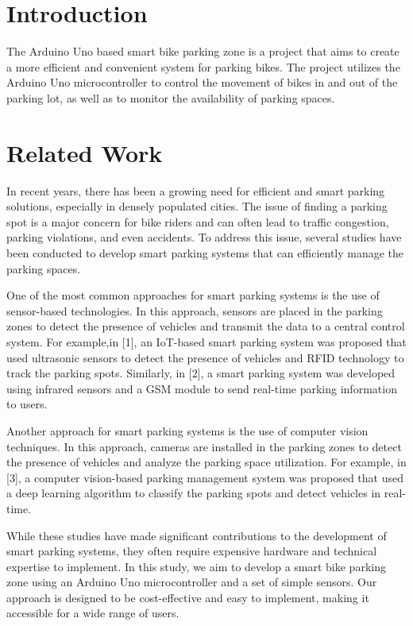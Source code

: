 \documentclass[conference]{IEEEtran}
\begin{document}
	\section{Introduction}
	The Arduino Uno based smart bike parking zone is a project that aims to create a more efficient and convenient system for parking bikes. The project utilizes the Arduino Uno microcontroller to control the movement of bikes in and out of the parking lot, as well as to monitor the availability of parking spaces. 
	
	\section{Related Work}
	In recent years, there has been a growing need for efficient and smart parking solutions, especially in densely populated cities. The issue of finding a parking spot is a major concern for bike riders and can often lead to traffic congestion, parking violations, and even accidents. To address this issue, several studies have been conducted to develop smart parking systems that can efficiently manage the parking spaces.
	
	One of the most common approaches for smart parking systems is the use of sensor-based technologies. In this approach, sensors are placed in the parking zones to detect the presence of vehicles and transmit the data to a central control system. For example,in [1], an IoT-based smart parking system was proposed that used ultrasonic sensors to detect the presence of vehicles and RFID technology to track the parking spots. Similarly, in [2], a smart parking system was developed using infrared sensors and a GSM module to send real-time parking information to users.
	
	Another approach for smart parking systems is the use of computer vision techniques. In this approach, cameras are installed in the parking zones to detect the presence of vehicles and analyze the parking space utilization. For example, in [3], a computer vision-based parking management system was proposed that used a deep learning algorithm to classify the parking spots and detect vehicles in real-time.
	
	While these studies have made significant contributions to the development of smart parking systems, they often require expensive hardware and technical expertise to implement. In this study, we aim to develop a smart bike parking zone using an Arduino Uno microcontroller and a set of simple sensors. Our approach is designed to be cost-effective and easy to implement, making it accessible for a wide range of users.
	
\end{document}
